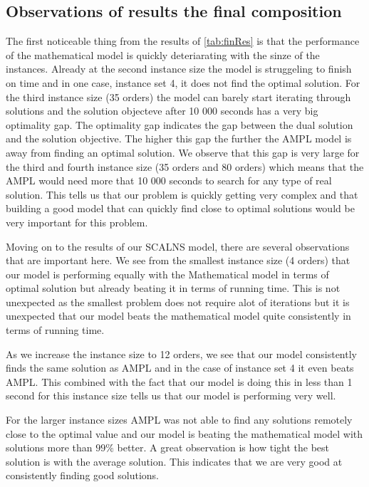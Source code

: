 \documentclass[../main.tex]{subfiles}
\begin{document}
\subsection{Observations of results  the final composition}
\label{sec:finalObs}
The first noticeable thing from the results of \cref{tab:finRes} is that the performance of the mathematical model is quickly deteriarating with the sinze of the instances.
Already at the second instance size the model is struggeling to finish on time and in one case, instance set 4, it does not find the optimal solution.
For the third instance size (35 orders) the model can barely start iterating through solutions and the solution objecteve after 10 000 seconds has a very big optimality gap. 
The optimality gap indicates the gap between the dual solution and the solution objective.
The higher this gap the further the AMPL model is away from finding an optimal solution.
We observe that this gap is very large for the third and fourth instance size (35 orders and 80 orders) which means that the AMPL would need more that 10 000 seconds to search for any type of real solution.
This tells us that our problem is quickly getting very complex and that building a good model that can quickly find close to optimal solutions would be very important for this problem.
\par
Moving on to the results of our SCALNS model, there are several observations that are important here. 
We see from the smallest instance size (4 orders) that our model is performing equally with the Mathematical model in terms of optimal solution but already beating it in terms of running time.
This is not unexpected as the smallest problem does not require alot of iterations but it is unexpected that our model beats the mathematical model quite consistently in terms of running time.
\par
As we increase the instance size to 12 orders, we see that our model consistently finds the same solution as AMPL and in the case of instance set 4 it even beats AMPL.
This combined with the fact that our model is doing this in less than 1 second for this instance size tells us that our model is performing very well.
\par
For the larger instance sizes AMPL was not able to find any solutions remotely close to the optimal value and our model is beating the mathematical model with solutions more than $99\%$ better.
A great observation is how tight the best solution is with the average solution. 
This indicates that we are very good at consistently finding good solutions. 
\end{document}
